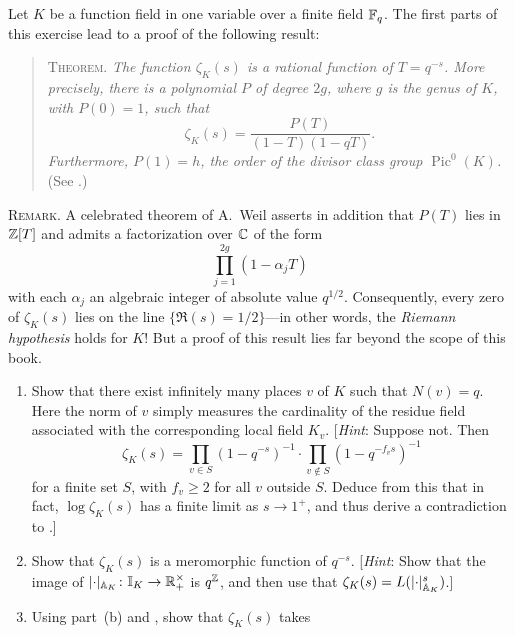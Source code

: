 \begin{exercise}[22]
  \label{ex:ch7-22}
  Let $K$ be a function field in one variable over a finite field $\mathbb{F}_q$.
  The first parts of this exercise lead to a proof of the following result:
  \begin{quote}
    \textsc{Theorem.} \emph{The function $\zeta_K(s)$ is a rational function
    of $T = q^{-s}$. More precisely, there is a polynomial $P$ of degree
    $2g$, where $g$ is the genus of $K$, with $P(0) = 1$, such that}
    \[
      \zeta_K(s) = \frac{P(T)}{(1-T)(1-qT)}.
    \]
    \emph{Furthermore, $P(1) = h$, the order of the divisor class group
    $\operatorname{Pic}^0(K)$.} (See .)
  \end{quote}
  \textsc{Remark}. A celebrated theorem of A.~Weil asserts in addition that
  $P(T)$ lies in $\mathbb{Z}[T]$ and admits a factorization over $\mathbb{C}$ of the form
  \[
    \prod_{j=1}^{2g} (1 - \alpha_j T)
  \]
  with each $\alpha_j$ an algebraic integer of absolute value $q^{1/2}$.
  Consequently, every zero of $\zeta_K(s)$ lies on the line
  $\{\Re(s) = 1/2\}$---in other words, the \emph{Riemann hypothesis} holds
  for $K$! But a proof of this result lies far beyond the scope of this book.
  \begin{enumerate}[label=(\alph*)]
    \item Show that there exist infinitely many places $v$ of $K$ such that
      $N(v) = q$. Here the norm of $v$ simply measures the cardinality of the
      residue field associated with the corresponding local field $K_v$.
      [\emph{Hint}: Suppose not. Then
      \[
        \zeta_K(s) = \prod_{v \in S} (1 - q^{-s})^{-1}
        \cdot \prod_{v \notin S} (1 - q^{-f_v s})^{-1}
      \]
      for a finite set $S$, with $f_v \ge 2$ for all $v$ outside $S$. Deduce
      from this that in fact, $\log\zeta_K(s)$ has a finite limit as
      $s \to 1^+$, and thus derive a contradiction to .]
    \item Show that $\zeta_K(s)$ is a meromorphic function of $q^{-s}$.
      [\emph{Hint}: Show that the image of
      $\lvert\cdot\rvert_{\mathbb{A}_K} \colon \mathbb{I}_K \to \mathbb{R}_+^\times$ is $q^{\mathbb{Z}}$, and
      then use that $\zeta_K(s) = L(\lvert\cdot\rvert_{\mathbb{A}_K}^s)$.]
    \item Using part~(b) and , show that $\zeta_K(s)$ takes

\end{enumerate}
\end{exercise}
